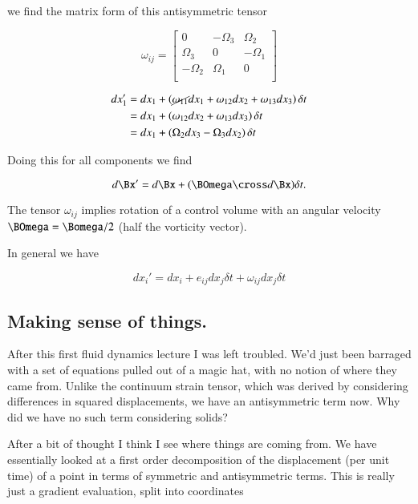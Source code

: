 we find the matrix form of this antisymmetric tensor

\begin{equation}\label{eqn:continuumL8:410}
\omega_{ij}
=
\begin{bmatrix}
0 & -\Omega_3 & \Omega_2 \\
\Omega_3 & 0 & -\Omega_1 \\
-\Omega_2 & \Omega_1 & 0 \\
\end{bmatrix}
\end{equation}

\begin{align*}
dx_1'
&= dx_1 + \left( \cancel{\omega_{11}} dx_1 + \omega_{12} dx_2 + \omega_{13} dx_3 \right) \delta t \\
&= dx_1 + \left( \omega_{12} dx_2 + \omega_{13} dx_3 \right) \delta t \\
&= dx_1 + \left( \Omega_2 dx_3 - \Omega_3 dx_2 \right) \delta t
\end{align*}

Doing this for all components we find

\begin{equation}\label{eqn:continuumL8:430}
d\Bx' = d\Bx + (\BOmega \cross d\Bx) \delta t.
\end{equation}

The tensor $\omega_{ij}$ implies rotation of a control volume with an angular velocity $\BOmega = \Bomega/2$ (half the vorticity vector).

In general we have

\begin{equation}\label{eqn:continuumL8:450}
dx_i' = dx_i + e_{ij} dx_j \delta t + \omega_{ij} dx_j \delta t
\end{equation}

\subsection{Making sense of things.}

After this first fluid dynamics lecture I was left troubled.  We'd just been barraged with a set of equations pulled out of a magic hat, with no notion of where they came from.  Unlike the continuum strain tensor, which was derived by considering differences in squared displacements, we have an antisymmetric term now.  Why did we have no such term considering solids?

After a bit of thought I think I see where things are coming from.  We have essentially looked at a first order decomposition of the displacement (per unit time) of a point in terms of symmetric and antisymmetric terms.  This is really just a gradient evaluation, split into coordinates


